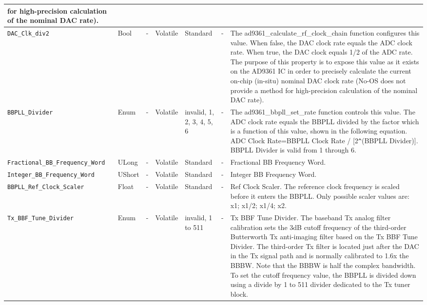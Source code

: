 \documentclass{article}
\begin{document}
\begin{landscape}
\begin{scriptsize}
\begin{longtable}{|p{3.6cm}|p{8.1cm}|p{1.4cm}|p{1.3cm}|p{1.4cm}|p{2.5cm}|p{3.6cm}|}
                                 for high-precision calculation of the nominal
                                 DAC rate). \\
			\hline
			\verb+DAC_Clk_div2+ & Bool & - & Volatile & Standard & - & 
                                The ad9361\_calculate\_rf\_clock\_chain
                                  function configures this value. When false,
                                  the DAC clock rate equals the ADC clock rate.
                                  When true, the DAC clock equals 1/2 of the ADC
                                  rate. The purpose of this property is to
                                  expose this value as it exists on the AD9361
                                  IC in order to precisely calculate the current
                                  on-chip (in-situ) nominal DAC clock rate
                                  (No-OS does not provide a method for
                                  high-precision calculation of the nominal DAC
                                  rate). \\
			\hline
			\verb+BBPLL_Divider+ & Enum & - & Volatile & invalid, 1, 2, 3, 4, 5, 6 & - & The ad9361\_bbpll\_set\_rate function controls this value. The ADC clock rate equals the BBPLL divided by the factor which is a function of this value, shown in the following equation. ADC Clock Rate=BBPLL Clock Rate / [2\texttt{\^}(BBPLL Divider)]. BBPLL Divider is valid from 1 through 6. \\
			\hline
			\verb+Fractional_BB_Frequency_Word+ & ULong & - & Volatile & Standard & - & Fractional BB Frequency Word. \\
			\hline
			\verb+Integer_BB_Frequency_Word+ & UShort & - & Volatile & Standard & - & Integer BB Frequency Word. \\
			\hline
			\verb+BBPLL_Ref_Clock_Scaler+ & Float & - & Volatile & Standard & - & Ref Clock Scaler. The reference clock frequency is scaled before it enters the BBPLL. Only possible scaler values are: x1; x1/2; x1/4; x2. \\
			\hline
			\verb+Tx_BBF_Tune_Divider+ & Enum & - & Volatile & invalid, 1 to 511 & - & Tx BBF Tune Divider. The baseband Tx analog filter calibration sets the 3dB cutoff frequency of the third-order Butterworth Tx anti-imaging filter based on the Tx BBF Tune Divider. The third-order Tx filter is located just after the DAC in the Tx signal path and is normally calibrated to 1.6x the BBBW. Note that the BBBW is half the complex bandwidth. To set the cutoff frequency value, the BBPLL is divided down using a divide by 1 to 511 divider dedicated to the Tx tuner block. \\

\end{longtable}
\end{scriptsize}
\end{landscape}
\end{document}

